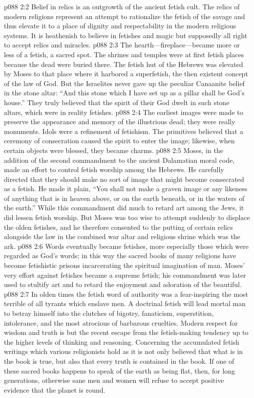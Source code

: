\vs p088 2:2 Belief in relics is an outgrowth of the ancient fetish cult. The relics of modern religions represent an attempt to rationalize the fetish of the savage and thus elevate it to a place of dignity and respectability in the modern religious systems. It is heathenish to believe in fetishes and magic but supposedly all right to accept relics and miracles.
\vs p088 2:3 The hearth---fireplace---became more or less of a fetish, a sacred spot. The shrines and temples were at first fetish places because the dead were buried there. The fetish hut of the Hebrews was elevated by Moses to that place where it harbored a superfetish, the then existent concept of the law of God. But the Israelites never gave up the peculiar Canaanite belief in the stone altar: “And this stone which I have set up as a pillar shall be God’s house.” They truly believed that the spirit of their God dwelt in such stone altars, which were in reality fetishes.
\pc \vs p088 2:4 The earliest images were made to preserve the appearance and memory of the illustrious dead; they were really monuments. Idols were a refinement of fetishism. The primitives believed that a ceremony of consecration caused the spirit to enter the image; likewise, when certain objects were blessed, they became charms.
\vs p088 2:5 Moses, in the addition of the second commandment to the ancient Dalamatian moral code, made an effort to control fetish worship among the Hebrews. He carefully directed that they should make no sort of image that might become consecrated as a fetish. He made it plain, “You shall not make a graven image or any likeness of anything that is in heaven above, or on the earth beneath, or in the waters of the earth.” While this commandment did much to retard art among the Jews, it did lessen fetish worship. But Moses was too wise to attempt suddenly to displace the olden fetishes, and he therefore consented to the putting of certain relics alongside the law in the combined war altar and religious shrine which was the ark.
\pc \vs p088 2:6 Words eventually became fetishes, more especially those which were regarded as God’s words; in this way the sacred books of many religions have become fetishistic prisons incarcerating the spiritual imagination of man. Moses’ very effort against fetishes became a supreme fetish; his commandment was later used to stultify art and to retard the enjoyment and adoration of the beautiful.
\vs p088 2:7 In olden times the fetish word of authority was a fear\hyp{}inspiring  the most terrible of all tyrants which enslave men. A doctrinal fetish will lead mortal man to betray himself into the clutches of bigotry, fanaticism, superstition, intolerance, and the most atrocious of barbarous cruelties. Modern respect for wisdom and truth is but the recent escape from the fetish\hyp{}making tendency up to the higher levels of thinking and reasoning. Concerning the accumulated fetish writings which various religionists hold as  it is not only believed that what is in the book is true, but also that every truth is contained in the book. If one of these sacred books happens to speak of the earth as being flat, then, for long generations, otherwise sane men and women will refuse to accept positive evidence that the planet is round.

